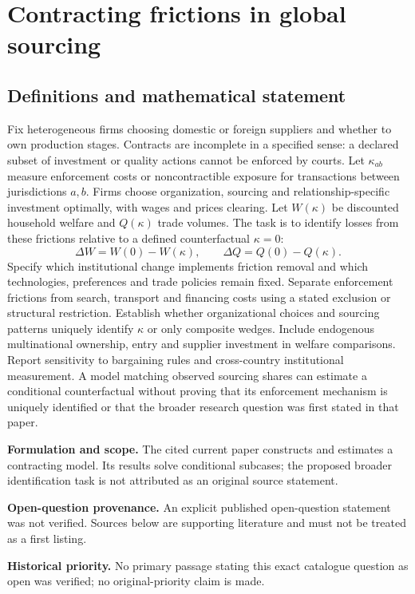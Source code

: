 \documentclass[11pt]{article}
\begin{document}
\section*{Contracting frictions in global sourcing}\label{30007631}
\subsection{Definitions and mathematical statement}
Fix heterogeneous firms choosing domestic or foreign suppliers and whether to own production stages. Contracts are incomplete in a specified sense: a declared subset of investment or quality actions cannot be enforced by courts. Let \(\kappa_{ab}\) measure enforcement costs or noncontractible exposure for transactions between jurisdictions \(a,b\). Firms choose organization, sourcing and relationship-specific investment optimally, with wages and prices clearing. Let \(W(\kappa)\) be discounted household welfare and \(Q(\kappa)\) trade volumes. The task is to identify losses from these frictions relative to a defined counterfactual \(\kappa=0\):
\[\Delta W=W(0)-W(\kappa),\qquad\Delta Q=Q(0)-Q(\kappa).\]
Specify which institutional change implements friction removal and which technologies, preferences and trade policies remain fixed. Separate enforcement frictions from search, transport and financing costs using a stated exclusion or structural restriction. Establish whether organizational choices and sourcing patterns uniquely identify \(\kappa\) or only composite wedges. Include endogenous multinational ownership, entry and supplier investment in welfare comparisons. Report sensitivity to bargaining rules and cross-country institutional measurement. A model matching observed sourcing shares can estimate a conditional counterfactual without proving that its enforcement mechanism is uniquely identified or that the broader research question was first stated in that paper.

\par\textbf{Formulation and scope.} The cited current paper constructs and estimates a contracting model. Its results solve conditional subcases; the proposed broader identification task is not attributed as an original source statement.

\par\textbf{Open-question provenance.} An explicit published open-question statement was not verified. Sources below are supporting literature and must not be treated as a first listing.

\par\textbf{Historical priority.} No primary passage stating this exact catalogue question as open was verified; no original-priority claim is made.
\end{document}
